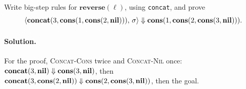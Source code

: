 \begin{exercise}
Write big-step rules for $\mathbf{reverse}(\ell)$, using \texttt{concat}, and prove
\[
\langle \mathbf{concat}(3,\mathbf{cons}(1,\mathbf{cons}(2,\mathbf{nil}))),\, \sigma \rangle \Downarrow \mathbf{cons}(1,\mathbf{cons}(2,\mathbf{cons}(3,\mathbf{nil}))).
\]
\end{exercise}

\paragraph{Solution.}
For the
proof, \textsc{Concat-Cons} twice and \textsc{Concat-Nil} once:
$\mathbf{concat}(3,\mathbf{nil}) \Downarrow \mathbf{cons}(3,\mathbf{nil})$, then
$\mathbf{concat}(3,\mathbf{cons}(2,\mathbf{nil})) \Downarrow \mathbf{cons}(2,\mathbf{cons}(3,\mathbf{nil}))$, then the goal.
